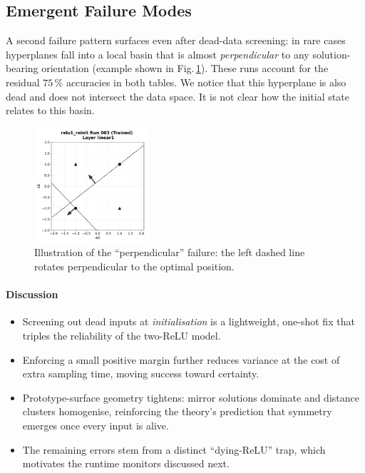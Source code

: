 \subsection*{Emergent Failure Modes}
A second failure pattern surfaces even after dead-data screening:
in rare cases hyperplanes fall into a local basin that is almost
\emph{perpendicular} to any solution-bearing orientation (example shown in Fig.\,\ref{fig:reinit-bad}).
These runs account for the residual $75\,\%$ accuracies in both tables. 
We notice that this hyperplane is also dead and does not intersect the data space.
It is not clear how the initial state relates to this basin.

\begin{figure}[h]
  \centering
  \includegraphics[width=0.38\textwidth]{relu1/figs/reinit_bad_example.pdf}
  \caption{Illustration of the ``perpendicular'' failure: the left dashed
           line rotates perpendicular to the optimal position.}
  \label{fig:reinit-bad}
\end{figure}

\paragraph{Discussion}
\begin{itemize}
  \item Screening out dead inputs at \emph{initialisation} is a
        lightweight, one-shot fix that triples the reliability of the
        two-ReLU model.
  \item Enforcing a small positive margin further reduces variance at the
        cost of extra sampling time, moving success toward certainty.
  \item Prototype-surface geometry tightens: mirror solutions dominate
        and distance clusters homogenise, reinforcing the theory's
        prediction that symmetry emerges once every input is alive.
  \item The remaining errors stem from a distinct ``dying-ReLU'' 
        trap, which motivates the runtime monitors discussed next.
\end{itemize}

\hrulefill
